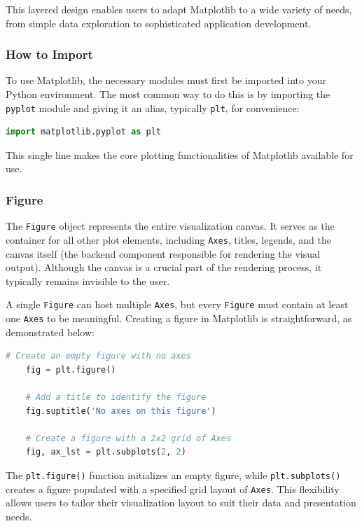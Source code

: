This layered design enables users to adapt Matplotlib to a wide variety of needs, from simple data exploration to sophisticated application development.

\subsubsection{How to Import}

To use Matplotlib, the necessary modules must first be imported into your Python environment. The most common way to do this is by importing the \texttt{pyplot} module and giving it an alias, typically \texttt{plt}, for convenience:

\begin{lstlisting}[language=Python]
	import matplotlib.pyplot as plt
\end{lstlisting}

This single line makes the core plotting functionalities of Matplotlib available for use.

\subsubsection{Figure}

The \texttt{Figure} object represents the entire visualization canvas. It serves as the container for all other plot elements, including \texttt{Axes}, titles, legends, and the canvas itself (the backend component responsible for rendering the visual output). Although the canvas is a crucial part of the rendering process, it typically remains invisible to the user.

A single \texttt{Figure} can host multiple \texttt{Axes}, but every \texttt{Figure} must contain at least one \texttt{Axes} to be meaningful. Creating a figure in Matplotlib is straightforward, as demonstrated below:

\begin{lstlisting}[language=Python]
	# Create an empty figure with no axes
	fig = plt.figure()
	
	# Add a title to identify the figure
	fig.suptitle('No axes on this figure')
	
	# Create a figure with a 2x2 grid of Axes
	fig, ax_lst = plt.subplots(2, 2)
\end{lstlisting}

The \texttt{plt.figure()} function initializes an empty figure, while \texttt{plt.subplots()} creates a figure populated with a specified grid layout of \texttt{Axes}. This flexibility allows users to tailor their visualization layout to suit their data and presentation needs.



